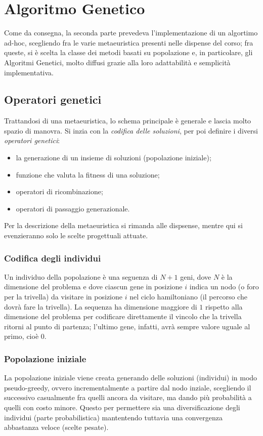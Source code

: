 
\section{Algoritmo Genetico}\label{sec:ga}
Come da consegna, la seconda parte prevedeva l'implementazione di un algortimo ad-hoc, scegliendo fra le varie
metaeuristica presenti nelle dispense del corso;
fra queste, si è scelta la classe dei metodi basati su popolazione e, in particolare, gli Algoritmi Genetici,
molto diffusi grazie alla loro adattabilità e semplicità implementativa.
\subsection{Operatori genetici}\label{subsec:operatori-genetici}
Trattandosi di una metaeuristica, lo schema principale è generale e lascia molto spazio di manovra.
Si inzia con la \textit{codifica delle soluzioni}, per poi definire i diversi \textit{operatori genetici}:
\begin{itemize}
	\item la generazione di un insieme di soluzioni (popolazione iniziale);
	\item funzione che valuta la fitness di una soluzione;
	\item operatori di ricombinazione;
	\item operatori di passaggio generazionale.
\end{itemize}
Per la descrizione della metaeuristica si rimanda alle dispsense, mentre qui si evenzieranno
solo le scelte progettuali attuate.
\subsubsection{Codifica degli individui}\label{subsubsec:codifica-individui}
Un individuo della popolazione è una seguenza di $N+1$ geni, dove $N$ è la dimensione del problema e
dove ciascun gene in posizione $i$ indica un nodo (o foro per la trivella) da visitare in posizione $i$
nel ciclo hamiltoniano (il percorso che dovrà fare la trivella).
La sequenza ha dimensione maggiore di $1$ rispetto alla dimensione del problema per codificare direttamente
il vincolo che la trivella ritorni al punto di partenza; l'ultimo gene, infatti, avrà sempre valore uguale
al primo, cioè $0$.
\subsubsection{Popolazione iniziale}\label{subsubsec:popolazione-inziale}
La popolazione iniziale viene creata generando delle soluzioni (individui) in modo pseudo-greedy, ovvero
incrementalmente a partire dal nodo inziale, scegliendo il successivo casualmente fra quelli ancora da visitare,
ma dando più probabilità a quelli con costo minore.
Questo per permettere sia una diversificazione degli individui (parte probabilistica) mantentendo tuttavia
una convergenza abbastanza veloce (scelte pesate).

